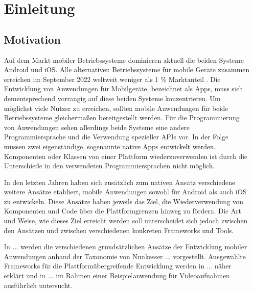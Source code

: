 \chapter{Einleitung}
\label{ch:Einleitung}


\section{Motivation}
\label{sec:Motivation}

Auf dem Markt mobiler Betriebssysteme dominieren aktuell die beiden Systeme Android und iOS.
Alle alternativen Betriebssysteme für mobile Geräte zusammen erreichen im September 2022 weltweit weniger als 1 \% Marktanteil \cite{mobile_market_share}.
Die Entwicklung von Anwendungen für Mobilgeräte, bezeichnet als Apps, muss sich dementsprechend vorrangig auf diese beiden Systeme konzentrieren.
Um möglichst viele Nutzer zu erreichen, sollten mobile Anwendungen für beide Betriebssysteme gleichermaßen bereitgestellt werden.
Für die Programmierung von Anwendungen sehen allerdings beide Systeme eine andere Programmiersprache und die Verwendung spezieller \acp{API} vor.
In der Folge müssen zwei eigenständige, sogenannte native Apps entwickelt werden.
Komponenten oder Klassen von einer Plattform wiederzuverwenden ist durch die Unterschiede in den verwendeten Programmiersprachen nicht möglich.

In den letzten Jahren haben sich zusätzlich zum nativen Ansatz verschiedene weitere Ansätze etabliert, mobile Anwendungen sowohl für Android als auch iOS zu entwickeln.
Diese Ansätze haben jeweils das Ziel, die Wiederverwendung von Komponenten und Code über die Plattformgrenzen hinweg zu fördern.
Die Art und Weise, wie dieses Ziel erreicht werden soll unterscheidet sich jedoch zwischen den Ansätzen und zwischen verschiedenen konkreten Frameworks und Tools.

In ... werden die verschiedenen grundsätzlichen Ansätze der Entwicklung mobiler Anwendungen anhand der Taxonomie von Nunkesser ... vorgestellt.
Ausgewählte Frameworks für die Plattformübergreifende Entwicklung werden in ... näher erklärt und in ... im Rahmen einer Beispielanwendung für Videoaufnahmen ausführlich untersucht.
